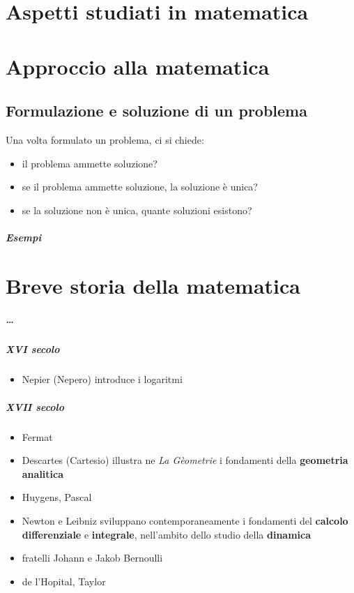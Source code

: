 
\chapter{Aspetti studiati in matematica}

\chapter{Approccio alla matematica}
\section{Formulazione e soluzione di un problema}
Una volta formulato un problema, ci si chiede:
\begin{itemize}
    \item il problema ammette soluzione?
    \item se il problema ammette soluzione, la soluzione è unica?
    \item se la soluzione non è unica, quante soluzioni esistono?
\end{itemize}

\paragraph{Esempi}


\chapter{Breve storia della matematica}
\paragraph{\dots}
\paragraph{XVI secolo}
\begin{itemize}
  \item Nepier (Nepero) introduce i logaritmi
\end{itemize}
\paragraph{XVII secolo}
\begin{itemize}
  \item Fermat
  \item Descartes (Cartesio) illustra ne \textit{La Gèometrie} i fondamenti della \textbf{geometria analitica}
  \item Huygens, Pascal
  \item Newton e Leibniz sviluppano contemporaneamente i fondamenti del \textbf{calcolo differenziale} e \textbf{integrale}, nell'ambito dello studio della \textbf{dinamica}
  \item fratelli Johann e Jakob Bernoulli
  \item de l'Hopital, Taylor
\end{itemize}
